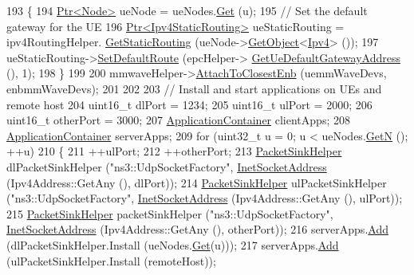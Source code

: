 \begin{DoxyCode}
193     \{
194       \hyperlink{classns3_1_1Ptr}{Ptr<Node>} ueNode = ueNodes.\hyperlink{classns3_1_1NodeContainer_a9ed96e2ecc22e0f5a3d4842eb9bf90bf}{Get} (u);
195       \textcolor{comment}{// Set the default gateway for the UE}
196       \hyperlink{classns3_1_1Ptr}{Ptr<Ipv4StaticRouting>} ueStaticRouting = ipv4RoutingHelper.
      \hyperlink{classns3_1_1Ipv4StaticRoutingHelper_a731206e50d305695dac7fb2ef963a4bb}{GetStaticRouting} (ueNode->\hyperlink{classns3_1_1Object_a13e18c00017096c8381eb651d5bd0783}{GetObject}<\hyperlink{classns3_1_1Ipv4}{Ipv4}> ());
197       ueStaticRouting->\hyperlink{classns3_1_1Ipv4StaticRouting_aee30fa3246c2b42f122dabdff2725331}{SetDefaultRoute} (epcHelper->
      \hyperlink{classns3_1_1MmWavePointToPointEpcHelper_afefac14ad79ff059b052305013d2beb3}{GetUeDefaultGatewayAddress} (), 1);
198     \}
199 
200   mmwaveHelper->\hyperlink{classns3_1_1MmWaveHelper_a202baea67b0af0d4fb6069de73766dc6}{AttachToClosestEnb} (uemmWaveDevs, enbmmWaveDevs);
201 
202 
203   \textcolor{comment}{// Install and start applications on UEs and remote host}
204   uint16\_t dlPort = 1234;
205   uint16\_t ulPort = 2000;
206   uint16\_t otherPort = 3000;
207   \hyperlink{classns3_1_1ApplicationContainer}{ApplicationContainer} clientApps;
208   \hyperlink{classns3_1_1ApplicationContainer}{ApplicationContainer} serverApps;
209   \textcolor{keywordflow}{for} (uint32\_t u = 0; u < ueNodes.\hyperlink{classns3_1_1NodeContainer_aed647ac56d0407a7706aba02eb44b951}{GetN} (); ++u)
210     \{
211       ++ulPort;
212       ++otherPort;
213       \hyperlink{classns3_1_1PacketSinkHelper}{PacketSinkHelper} dlPacketSinkHelper (\textcolor{stringliteral}{"ns3::UdpSocketFactory"}, 
      \hyperlink{classns3_1_1InetSocketAddress}{InetSocketAddress} (Ipv4Address::GetAny (), dlPort));
214       \hyperlink{classns3_1_1PacketSinkHelper}{PacketSinkHelper} ulPacketSinkHelper (\textcolor{stringliteral}{"ns3::UdpSocketFactory"}, 
      \hyperlink{classns3_1_1InetSocketAddress}{InetSocketAddress} (Ipv4Address::GetAny (), ulPort));
215       \hyperlink{classns3_1_1PacketSinkHelper}{PacketSinkHelper} packetSinkHelper (\textcolor{stringliteral}{"ns3::UdpSocketFactory"}, 
      \hyperlink{classns3_1_1InetSocketAddress}{InetSocketAddress} (Ipv4Address::GetAny (), otherPort));
216       serverApps.\hyperlink{classns3_1_1ApplicationContainer_ad09ab1a1ad5849d518d5f4c262e38152}{Add} (dlPacketSinkHelper.Install (ueNodes.\hyperlink{classns3_1_1NodeContainer_a9ed96e2ecc22e0f5a3d4842eb9bf90bf}{Get}(u)));
217       serverApps.\hyperlink{classns3_1_1ApplicationContainer_ad09ab1a1ad5849d518d5f4c262e38152}{Add} (ulPacketSinkHelper.Install (remoteHost));

\end{DoxyCode}
